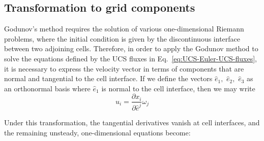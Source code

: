 \subsection{Transformation to grid components}
Godunov's method requires the solution of various one-dimensional Riemann problems, where the initial condition is given by the discontinuous interface between two adjoining cells. Therefore, in order to apply the Godunov method to solve the equations defined by the UCS fluxes in Eq.~\ref{eq:UCS-Euler-UCS-fluxes}, it is necessary to express the velocity vector in terms of components that are normal and tangential to the cell interface. If we define the vectors 
${\hat e_1},\,\,{\hat e_2},\,\,{\hat e_3}$
as an orthonormal basis where 
${\hat e_1}$ 
is normal to the cell interface, then we may write 
\[{u_i} = \frac{{\partial {x_i}}}{{\partial {{\hat e}^j}}}{\omega _j}\]

Under this transformation, the tangential derivatives vanish at cell interfaces, and the remaining unsteady, one-dimensional equations become\cite{Hui2007}:

